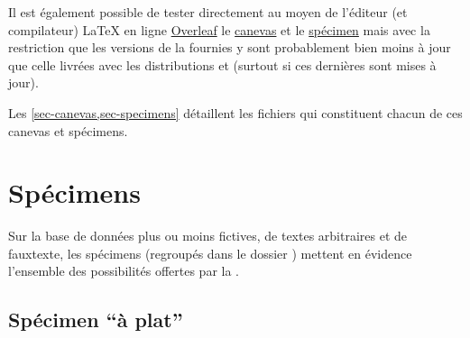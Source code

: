 Il est également possible de tester directement au moyen de l'éditeur (et
compilateur) \LaTeX{} en ligne%
%
%
%
%
\href{https://www.overleaf.com/}{Overleaf} le
\href{https://www.overleaf.com/latex/templates/template-of-a-thesis-written-with-yathesis-class/nhtmtthnqwtd}{canevas}
et le
\href{https://www.overleaf.com/latex/examples/sample-of-a-thesis-written-with-yathesis-class/nbcfvfqgnjfq}{spécimen}\enarborescence{}
mais avec la restriction que les versions de la \yatCl{} fournies y sont
probablement bien moins à jour que celle livrées avec les distributions
\texlive{} et \miktex{} (surtout si ces dernières sont mises à jour).

Les \vref{sec-canevas,sec-specimens} détaillent les fichiers qui constituent
chacun de ces canevas et spécimens.




\section{Spécimens}
\label{sec-specimens}

Sur la base de données plus ou moins fictives, de textes arbitraires et de
\gls{fauxtexte}, les spécimens (regroupés dans le dossier )
mettent en évidence l'ensemble des possibilités offertes par la \yatCl{}.

\subsection{Spécimen \enquote{à plat}}
\label{sec-specimen-a-plat}
%

